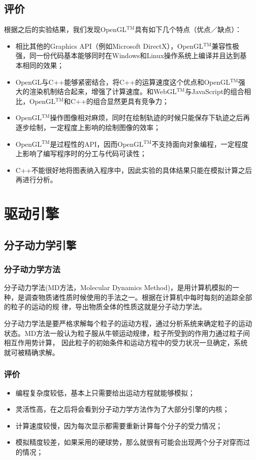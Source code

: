 ﻿\documentclass{article}
\begin{document}
	\subsection{评价}
	根据之后的实验结果，我们发现OpenGL$^{\text{TM}}$具有如下几个特点（优点／缺点）：
	\begin{itemize}
		\item 相比其他的Graphics API（例如Microsoft DirectX），OpenGL$^{\text{TM}}$兼容性极强，同一份代码基本能够同时在Windows和Linux操作系统上编译并且达到基本相同的效果；
		\item OpenGL与C++能够紧密结合，将C++的运算速度这个优点和OpenGL$^{\text{TM}}$强大的渲染机制结合起来，增强了计算速度。和WebGL$^{\text{TM}}$与JavaScript的组合相
		比，OpenGL$^{\text{TM}}$和C++的组合显然更具有竞争力；
		\item OpenGL$^{\text{TM}}$操作图像相对麻烦，同时在绘制轨迹的时候只能保存下轨迹之后再逐步绘制，一定程度上影响的绘制图像的效率；
		\item OpenGL$^{\text{TM}}$是过程性的API，因而OpenGL$^{\text{TM}}$不支持面向对象编程，一定程度上影响了编写程序时的分工与代码可读性；
		\item C++不能很好地将图表纳入程序中，因此实验的具体结果只能在模拟计算之后再进行分析。
	\end{itemize}
	\newpage
	\section{驱动引擎}
	\subsection{分子动力学引擎}
	\subsubsection{分子动力学方法}
	\indent 分子动力学法(MD方法，Molecular Dynamics Method)，是用计算机模拟的一种，是调查物质诸性质时候使用的手法之一。根据在计算机中每时每刻的追踪全部的粒子的运动的规
	律，导出物质全体的性质这就是分子动力学法。\par
	\indent 分子动力学法是要严格求解每个粒子的运动方程，通过分析系统来确定粒子的运动状态。MD方法一般认为粒子服从牛顿运动规律，粒子所受到的作用力通过粒子间相互作用势计算，
	因此粒子的初始条件和运动方程中的受力状况一旦确定，系统就可被精确求解。
	\subsubsection{评价}
	\begin{itemize}
		\item 编程复杂度较低，基本上只需要给出运动方程就能够模拟；
		\item 灵活性高，在之后将会看到分子动力学方法作为了大部分引擎的内核；
		\item 计算速度较慢，因为每次显示都需要重新计算每个分子的受力情况；
		\item 模拟精度较差，如果采用的硬球势，那么就很有可能会出现两个分子对穿而过的情况；
	\end{itemize}
\end{document}

